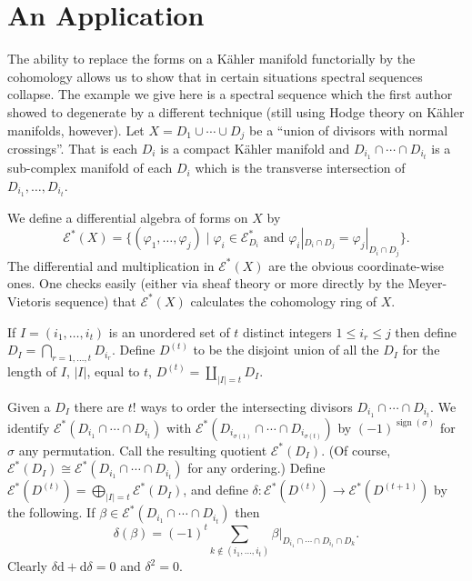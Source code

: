 \documentclass[11pt]{amsart}
\theoremstyle{plain}
\theoremstyle{definition}
\newcommand{\sE}{\mathscr{E}}
\newcommand{\dd}{\mathrm{d}}
\begin{document}
\section{An Application}

The ability to replace the forms on a K\"ahler manifold functorially by the cohomology allows us to show that in certain situations spectral sequences collapse. The example we give here is a spectral sequence which the first author \cite{D1} showed to degenerate by a different technique (still using Hodge theory on K\"ahler manifolds, however). Let $X = D_{1} \cup \cdots \cup D_{j}$ be a ``union of divisors with normal crossings''. That is each $D_{i}$ is a compact K\"ahler manifold and $D_{i_{1}} \cap \cdots \cap D_{i_{t}}$ is a sub-complex manifold of each $D_{i}$ which is the transverse intersection of $D_{i_{1}}, \ldots, D_{i_{t}}$.

We define a differential algebra of forms on $X$ by
\[
\sE^{*}(X) = \{(\varphi_{1}, \ldots, \varphi_{j}) \mid \varphi_{i} \in \sE^{*}_{D_{i}} \text{ and } \varphi_{i}|_{D_{i} \cap D_{j}} = \varphi_{j}|_{D_{i} \cap D_{j}}\}.
\]
The differential and multiplication in $\sE^{*}(X)$ are the obvious coordinate-wise ones. One checks easily (either via sheaf theory or more directly by the Meyer-Vietoris sequence) that $\sE^{*}(X)$ calculates the cohomology ring of $X$.

If $I = (i_{1}, \ldots, i_{t})$ is an unordered set of $t$ distinct integers $1 \le i_{r} \le j$ then define $D_{I} = \bigcap_{r=1, \ldots, t} D_{i_{r}}$. Define $D^{(t)}$ to be the disjoint union of all the $D_{I}$ for the length of $I$, $|I|$, equal to $t$, $D^{(t)} = \coprod_{|I|=t} D_{I}$.

Given a $D_{I}$ there are $t!$ ways to order the intersecting divisors $D_{i_{1}} \cap \cdots \cap D_{i_{t}}$. We identify $\sE^{*}(D_{i_{1}} \cap \cdots \cap D_{i_{t}})$ with $\sE^{*}(D_{i_{\sigma(1)}} \cap \cdots \cap D_{i_{\sigma(t)}})$ by $(-1)^{\operatorname{sign}(\sigma)}$ for $\sigma$ any permutation. Call the resulting quotient $\sE^{*}(D_{I})$. (Of course, $\sE^{*}(D_{I}) \cong \sE^{*}(D_{i_{1}} \cap \cdots \cap D_{i_{t}})$ for any ordering.) Define $\sE^{*}(D^{(t)}) = \bigoplus_{|I|=t} \sE^{*}(D_{I})$, and define $\delta \colon \sE^{*}(D^{(t)}) \to \sE^{*}(D^{(t+1)})$ by the following. If $\beta \in \sE^{*}(D_{i_{1}} \cap \cdots \cap D_{i_{t}})$ then
\[
\delta(\beta) = (-1)^{t} \sum_{k \notin (i_{1}, \ldots, i_{t})} \beta|_{D_{i_{1}} \cap \cdots \cap D_{i_{t}} \cap D_{k}}.
\]
Clearly $\delta\dd + \dd\delta = 0$ and $\delta^{2} = 0$.
\end{document}
